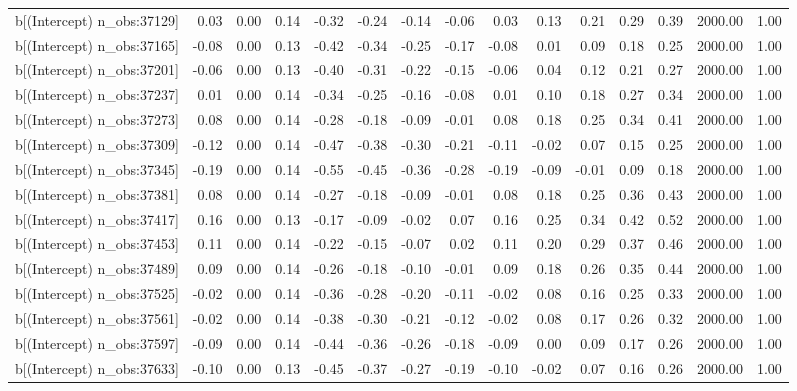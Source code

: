 \begin{table}[ht]
\begin{tabular}{rrrrrrrrrrrrrrr}
  b[(Intercept) n\_obs:37129] & 0.03 & 0.00 & 0.14 & -0.32 & -0.24 & -0.14 & -0.06 & 0.03 & 0.13 & 0.21 & 0.29 & 0.39 & 2000.00 & 1.00 \\ 
  b[(Intercept) n\_obs:37165] & -0.08 & 0.00 & 0.13 & -0.42 & -0.34 & -0.25 & -0.17 & -0.08 & 0.01 & 0.09 & 0.18 & 0.25 & 2000.00 & 1.00 \\ 
  b[(Intercept) n\_obs:37201] & -0.06 & 0.00 & 0.13 & -0.40 & -0.31 & -0.22 & -0.15 & -0.06 & 0.04 & 0.12 & 0.21 & 0.27 & 2000.00 & 1.00 \\ 
  b[(Intercept) n\_obs:37237] & 0.01 & 0.00 & 0.14 & -0.34 & -0.25 & -0.16 & -0.08 & 0.01 & 0.10 & 0.18 & 0.27 & 0.34 & 2000.00 & 1.00 \\ 
  b[(Intercept) n\_obs:37273] & 0.08 & 0.00 & 0.14 & -0.28 & -0.18 & -0.09 & -0.01 & 0.08 & 0.18 & 0.25 & 0.34 & 0.41 & 2000.00 & 1.00 \\ 
  b[(Intercept) n\_obs:37309] & -0.12 & 0.00 & 0.14 & -0.47 & -0.38 & -0.30 & -0.21 & -0.11 & -0.02 & 0.07 & 0.15 & 0.25 & 2000.00 & 1.00 \\ 
  b[(Intercept) n\_obs:37345] & -0.19 & 0.00 & 0.14 & -0.55 & -0.45 & -0.36 & -0.28 & -0.19 & -0.09 & -0.01 & 0.09 & 0.18 & 2000.00 & 1.00 \\ 
  b[(Intercept) n\_obs:37381] & 0.08 & 0.00 & 0.14 & -0.27 & -0.18 & -0.09 & -0.01 & 0.08 & 0.18 & 0.25 & 0.36 & 0.43 & 2000.00 & 1.00 \\ 
  b[(Intercept) n\_obs:37417] & 0.16 & 0.00 & 0.13 & -0.17 & -0.09 & -0.02 & 0.07 & 0.16 & 0.25 & 0.34 & 0.42 & 0.52 & 2000.00 & 1.00 \\ 
  b[(Intercept) n\_obs:37453] & 0.11 & 0.00 & 0.14 & -0.22 & -0.15 & -0.07 & 0.02 & 0.11 & 0.20 & 0.29 & 0.37 & 0.46 & 2000.00 & 1.00 \\ 
  b[(Intercept) n\_obs:37489] & 0.09 & 0.00 & 0.14 & -0.26 & -0.18 & -0.10 & -0.01 & 0.09 & 0.18 & 0.26 & 0.35 & 0.44 & 2000.00 & 1.00 \\ 
  b[(Intercept) n\_obs:37525] & -0.02 & 0.00 & 0.14 & -0.36 & -0.28 & -0.20 & -0.11 & -0.02 & 0.08 & 0.16 & 0.25 & 0.33 & 2000.00 & 1.00 \\ 
  b[(Intercept) n\_obs:37561] & -0.02 & 0.00 & 0.14 & -0.38 & -0.30 & -0.21 & -0.12 & -0.02 & 0.08 & 0.17 & 0.26 & 0.32 & 2000.00 & 1.00 \\ 
  b[(Intercept) n\_obs:37597] & -0.09 & 0.00 & 0.14 & -0.44 & -0.36 & -0.26 & -0.18 & -0.09 & 0.00 & 0.09 & 0.17 & 0.26 & 2000.00 & 1.00 \\ 
  b[(Intercept) n\_obs:37633] & -0.10 & 0.00 & 0.13 & -0.45 & -0.37 & -0.27 & -0.19 & -0.10 & -0.02 & 0.07 & 0.16 & 0.26 & 2000.00 & 1.00 \\ 

\end{tabular}
\end{table}
